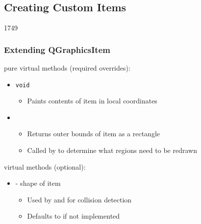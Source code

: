 %
%
%
%

\subsection{Creating Custom Items}
\begin{slide}{1749}

\frametitle{Extending QGraphicsItem}
 pure virtual methods (required overrides):

\begin{itemize}
\item \texttt{void }
    \begin{itemize}
    \item Paints contents of item in local coordinates
    \end{itemize}
\item {} 
    \begin{itemize}
    \item Returns outer bounds of item as a rectangle
    \item Called by  to determine what regions need to be redrawn

    \end{itemize}
\end{itemize}

 virtual methods (optional):

\begin{itemize}
\item {}  - shape of item
\begin{itemize}
    \item Used by  and  for collision detection
    \item Defaults to  if not implemented
    \end{itemize}
\end{itemize}
\end{slide}


